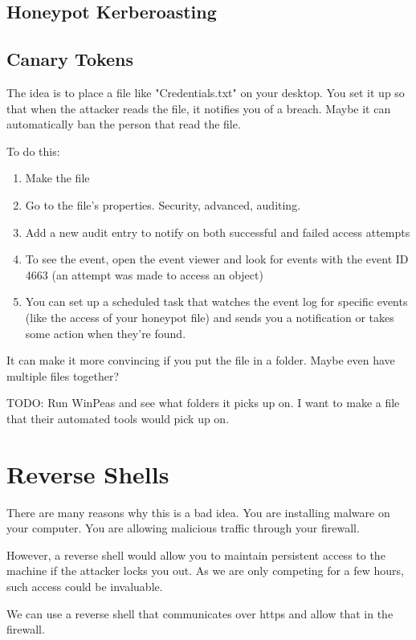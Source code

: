 \documentclass{article}
\begin{document}
\subsection{Honeypot Kerberoasting}

\subsection{Canary Tokens}
The idea is to place a file like "Credentials.txt" on your desktop.
You set it up so that when the attacker reads the file, it notifies you of a breach.
Maybe it can automatically ban the person that read the file.

To do this:
\begin{enumerate}
    \item Make the file
    \item Go to the file's properties. Security, advanced, auditing.
    \item Add a new audit entry to notify on both successful and failed access attempts
    \item To see the event, open the event viewer and look for events with the event ID 4663 (an attempt was made to access an object)
    \item You can set up a scheduled task that watches the event log for specific events (like the access of your honeypot file) and sends you a notification or takes some action when they're found.
\end{enumerate}

It can make it more convincing if you put the file in a folder. Maybe even have multiple files together?

TODO: Run WinPeas and see what folders it picks up on. I want to make a file that their automated
tools would pick up on.

\section{Reverse Shells}
There are many reasons why this is a bad idea. You are installing malware on your computer. 
You are allowing malicious traffic through your firewall.

However, a reverse shell would allow you to maintain persistent access to the machine if the attacker locks you out.
As we are only competing for a few hours, such access could be invaluable.

We can use a reverse shell that communicates over https and allow that in the firewall.
\end{document}
